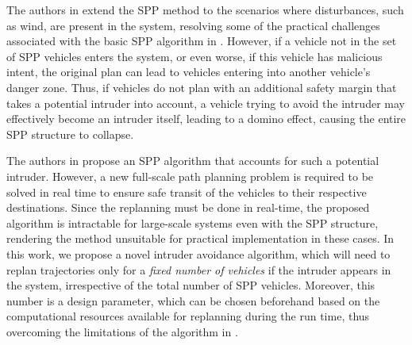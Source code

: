 The authors in \cite{Bansal2017} extend the SPP method to the scenarios where disturbances, such as wind, are present in the system, resolving some of the practical challenges associated with the basic SPP algorithm in \cite{Chen15c}. However, if a vehicle not in the set of SPP vehicles enters the system, or even worse, if this vehicle has malicious intent, the original plan can lead to vehicles entering into another vehicle’s danger zone. Thus, if vehicles do not plan with an additional safety margin that takes a potential intruder into account, a vehicle trying to avoid the intruder may effectively become an intruder itself, leading to a domino effect, causing the entire SPP structure to collapse. 

The authors in \cite{chen2016robust} propose an SPP algorithm that accounts for such a potential intruder. However, a new full-scale path planning problem is required to be solved in real time to ensure safe transit of the vehicles to their respective destinations. Since the replanning must be done in real-time, the proposed algorithm is intractable for large-scale systems even with the SPP structure, rendering the method unsuitable for practical implementation in these cases. In this work, we propose a novel intruder avoidance algorithm, which will need to replan trajectories only for a \textit{fixed number of vehicles} if the intruder appears in the system, irrespective of the total number of SPP vehicles. Moreover, this number is a design parameter, which can be chosen beforehand based on the computational resources available for replanning during the run time, thus overcoming the limitations of the algorithm in \cite{chen2016robust}. 

